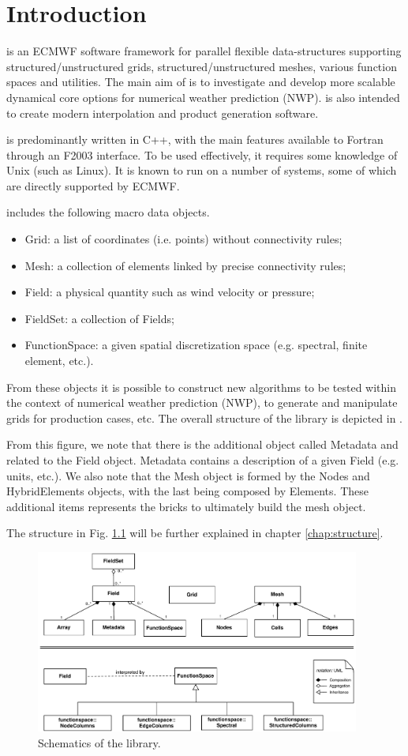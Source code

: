 \chapter{Introduction}
\Atlas is an ECMWF software framework for parallel flexible 
data-structures supporting structured/unstructured grids, 
structured/unstructured meshes, various function spaces 
and utilities.  
The main aim of \Atlas is to investigate and develop more 
scalable dynamical core options for numerical weather prediction 
(NWP). \Atlas is also intended to create modern interpolation 
and product generation software.

\Atlas is predominantly written in C++, with the main features 
available to Fortran through an F2003 interface. To be used 
effectively, it requires some knowledge of Unix (such as Linux). 
It is known to run on a number of systems, some of which are 
directly supported by ECMWF.

\Atlas includes the following macro data objects.
%
\begin{itemize}
\item Grid: a list of coordinates (i.e. points) without connectivity rules;
\item Mesh: a collection of elements linked by precise connectivity rules;
\item Field: a physical quantity such as wind velocity or pressure;
\item FieldSet: a collection of Fields;
\item FunctionSpace: a given spatial discretization space (e.g. spectral, 
finite element, etc.).
\end{itemize}
%
From these objects it is possible to construct new algorithms 
to be tested within the context of numerical weather prediction 
(NWP), to generate and manipulate grids for production 
cases, etc. The overall structure of the library is depicted 
in .

From this figure, we note that there is the additional object 
called Metadata and related to the Field object. Metadata 
contains a description of a given Field (e.g. units, etc.).
We also note that the Mesh object is formed by the Nodes 
and HybridElements objects, with the last being composed 
by Elements. These additional items represents the bricks 
to ultimately build the mesh object.
 
The structure in Fig. \ref{fig:intro-schematics} will be 
further explained in chapter \ref{chap:structure}.
%
\begin{figure}[htb!]
\centering
\includegraphics[width=0.95\textwidth]{imgs/schematics.pdf}
\caption{Schematics of the \Atlas library.}
\label{fig:intro-schematics}
\end{figure}
%